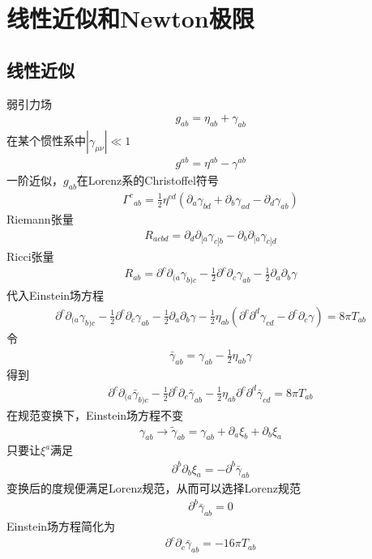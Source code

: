 \section{线性近似和Newton极限}

\subsection{线性近似}

弱引力场
\begin{gather*}
    g_{ab}=\eta_{ab}+\gamma_{ab}
\end{gather*}
在某个惯性系中$|\gamma_{\mu \nu}|\ll 1$
\begin{gather*}
    g^{ab}=\eta^{ab}-\gamma^{ab}
\end{gather*}
一阶近似，$g_{ab}$在Lorenz系的Christoffel符号
\begin{gather*}
    {\Gamma^c}_{ab}=\frac{1}{2}\eta^{cd}(\partial_a \gamma_{bd}+\partial_b \gamma_{ad}-\partial_d \gamma_{ab})
\end{gather*}
Riemann张量
\begin{gather*}
    R_{acbd}=\partial_d \partial_{[a} \gamma_{c]b}-\partial_b \partial_{[a} \gamma_{c]d}
\end{gather*}
Ricci张量
\begin{gather*}
    R_{ab}=\partial^c \partial_{(a} \gamma_{b)c}-\frac{1}{2} \partial^c \partial_c \gamma_{ab}-\frac{1}{2}\partial_a \partial_b \gamma
\end{gather*}
代入Einstein场方程
\begin{gather*}
    \partial^c \partial_{(a} \gamma_{b)c}-\frac{1}{2} \partial^c \partial_c \gamma_{ab}-\frac{1}{2}\partial_a \partial_b \gamma-\frac{1}{2}\eta_{ab}(\partial^c \partial^d \gamma_{cd}-\partial^c \partial_c \gamma)=8\pi T_{ab}
\end{gather*}
令
\begin{gather*}
    \bar{\gamma}_{ab}=\gamma_{ab}-\frac{1}{2}\eta_{ab} \gamma
\end{gather*}
得到
\begin{gather*}
    \partial^c \partial_{(a} \bar{\gamma}_{b)c}-\frac{1}{2} \partial^c \partial_c \bar{\gamma}_{ab}-\frac{1}{2}\eta_{ab}\partial^c \partial^d \bar{\gamma}_{cd}=8\pi T_{ab}
\end{gather*}
在规范变换下，Einstein场方程不变
\begin{gather*}
    \gamma_{ab} \to \tilde{\gamma}_{ab}=\gamma_{ab}+\partial_a \xi_b + \partial_b \xi_a
\end{gather*}
只要让$\xi^a$满足
\begin{gather*}
    \partial^b \partial_b \xi_a=-\partial^b \bar{\gamma}_{ab}
\end{gather*}
变换后的度规便满足Lorenz规范，从而可以选择Lorenz规范
\begin{gather*}
    \partial^b \bar{\gamma}_{ab}=0
\end{gather*}
Einstein场方程简化为
\begin{gather*}
    \partial^c \partial_c \bar{\gamma}_{ab}=-16\pi T_{ab}
\end{gather*}

